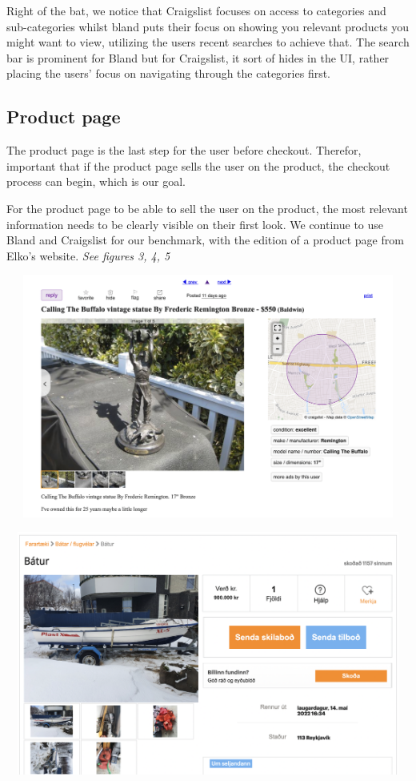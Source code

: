 Right of the bat, we notice that Craigslist focuses on access to categories and sub-categories whilst bland puts their focus on showing you relevant products you might want to view, utilizing the users recent searches to achieve that.
The search bar is prominent for Bland but for Craigslist, it sort of hides in the UI, rather placing the users' focus on navigating through the categories first. 

\subsection{Product page}
The product page is the last step for the user before checkout. Therefor, important that if the product page sells the user on the product, the checkout process can begin, which is our goal. 

For the product page to be able to sell the user on the product, the most relevant information needs to be clearly visible on their first look. We continue to use Bland and Craigslist for our benchmark, with the edition of a product page from Elko's website. \textit{See figures 3, 4, 5}
\begin{Figure}
    \begin{center}
        \includegraphics[width=150mm, height=80mm]{Images/benchmarking/product_page_cl.png}
    \end{center}
\end{Figure}
\begin{Figure}
    \begin{center}
        \includegraphics[width=150mm, height=80mm]{Images/benchmarking/product_page_bland.png}
    \end{center}
\end{Figure}
